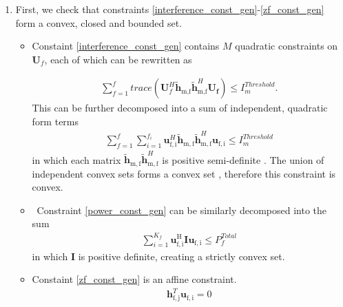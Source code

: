 \documentclass[12pt,a4paper]{report}
\begin{document}
\begin{enumerate}
\item
First, we check that constraints \eqref{interference_const_gen}-\eqref{zf_const_gen} form a convex, closed and bounded set. 

\begin{itemize}

\item
	Constaint \eqref{interference_const_gen} contains $M$ quadratic constraints on $\mathbf{U}_f$, each of which 
	can be rewritten  as

\begin{gather*}
	\sum_{f=1}^{f}
	trace(\mathbf{U}_{f}^H \mathbf{\tilde{h}}_{\text{m,f}} \mathbf{\tilde{h}}_{\text{m,f}}^H \mathbf{U_f} )\leq 
	I^{Threshold}_{m}.
\end{gather*}
This can be further decomposed into a sum of independent, quadratic form terms
	\begin{gather*}
	\sum_{f=1}^{f}
	\sum_{i=1}^{f_i}
	\mathbf{u}_{\mathrm{f,i}}^H\mathbf{\tilde{h}}_{\mathrm{m,f}} \mathbf{\tilde{h}}_{\mathrm{m,f}}^H
	\mathbf{u}_{\mathrm{f,i}} \leq I^{Threshold}_{m}
	\end{gather*}
in which each matrix $\mathbf{\tilde{h}_{\mathrm{m,f}}} \mathbf{\tilde{h}}_{\mathrm{m,f}}^H$ is positive semi-definite \cite[p.~8,9]{BoV:04}. The union of independent convex sets forms a convex set \cite{BoV:04}, therefore this constraint is convex. 

\item \
	Constraint \eqref{power_const_gen} can be similarly decomposed into the sum
	\begin{gather*}
		\sum_{i=1}^{K_{f}}\mathbf{u_{\mathrm{f,i}}^{\mathrm{H}}} \mathbf{I} 		
		\mathbf{u_{\mathrm{f,i}}} \leq  P^{Total}_{f}
	\end{gather*}
	in which $\mathbf{I}$ is positive definite, creating a strictly convex set.

\item 
	Constaint \eqref{zf_const_gen} is an affine constraint. 
		\begin{gather*}
		\mathbf{h}_{\mathrm{f,j}}^T \mathbf{u}_{\mathrm{f,i}} =0
		\end{gather*}
\end{itemize}



\end{enumerate}
\end{document}
